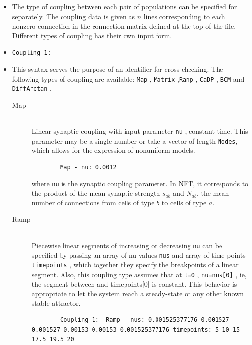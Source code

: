 \documentclass[12pt,a4paper]{article}
\newcommand{\type}[1]{{\small\small\tt #1} }
\begin{document}
\begin{itemize}

\item The type of coupling between each pair of populations can be specified for separately. The coupling data is given as $n$ lines  corresponding to each nonzero connection in the connection matrix defined at the top of the file. Different types of coupling has their own input form.
\item \begin{lstlisting}
Coupling 1:
\end{lstlisting}
\item This syntax serves the purpose of an identifier for cross-checking. The following types of coupling are available:  \type{Map},  \type{Matrix},\type{Ramp}, \type{CaDP}, \type{BCM} and \type{DiffArctan}.
\begin{description}

\item[Map]\ \\
    Linear synaptic coupling with input parameter \type{nu}, constant time.
    This parameter may be a single number or take a vector of length
    \texttt{Nodes}, which allows for the expression of nonuniform models.
    \begin{lstlisting}
        Map - nu: 0.0012
    \end{lstlisting}
    where \type{nu} is the synaptic coupling parameter. In NFT, it corresponds
    to the product of the mean synaptic strength $s_{ab}$ and $N_{ab}$, the
    mean number of connections from cells of type $b$ to cells of type $a$.


\item[Ramp]\ \\
    Piecewise linear segments of increasing or decreasing \type{nu} can be
    specified by passing an array of nu values \type{nus} and array of time
    points \type{timepoints}, which together they specify the breakpoints  of
    a linear segment. Also, this coupling type assumes that at \type{t=0},
    \type{nu=nus[0]}, ie, the segment between  and timepoints[0] is
    constant. This behavior is appropriate to let the system reach a steady-state 
    or any other known stable attractor. 

    \begin{lstlisting}
        Coupling 1:  Ramp - nus: 0.001525377176 0.001527 0.001527 0.00153 0.00153 0.001525377176 timepoints: 5 10 15 17.5 19.5 20
    \end{lstlisting}


\end{description}
\end{itemize}
\end{document}
